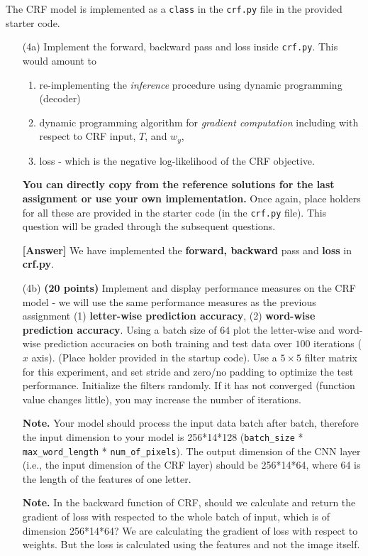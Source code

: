 \documentclass[11pt]{report}
\begin{document}
The CRF model is implemented as a \texttt{class} in the \texttt{crf.py} file in
the provided starter code.
%
\begin{itemize}
\item[(4a)] Implement the forward, backward pass and loss inside
  \texttt{crf.py}. This would amount to 
  \begin{enumerate}
  	\item re-implementing the \emph{inference} procedure using dynamic programming (decoder) 
  	\item dynamic programming algorithm for \emph{gradient computation} including with respect to CRF input, $T$, and $w_y$,
  	\item loss - which is the negative log-likelihood of the CRF objective. 
  \end{enumerate} 
	\textbf{You can directly copy from the reference solutions for the last assignment or use your own implementation.}
  Once again, place holders for
  all these are provided in the starter code (in the \texttt{crf.py} file). This
  question will be graded through the subsequent questions.

\item[\textbf{ [Answer] } ]{
We have implemented the \textbf{forward, backward} pass and \textbf{loss} in \textbf{crf.py}.
}


\item[(4b)] \textbf{(20 points)} Implement and display performance measures on
  the CRF model - we will use the same performance measures as the previous
  assignment (1) \textbf{letter-wise prediction accuracy}, (2) \textbf{word-wise
    prediction accuracy}. Using a batch size of \(64\) plot the letter-wise and
  word-wise prediction accuracies on both training and test data over \(100\)
  iterations (\(x\) axis). (Place holder provided in the startup code). Use a
  \(5 \times 5\) filter matrix for this experiment, and set stride and zero/no
  padding to optimize the test performance.
  Initialize the filters randomly.
  If it has not converged (function value changes little), you may increase the number of iterations.

{\bf Note.} Your model should process the input data batch after batch, therefore the input dimension to your model is 256*14*128 (\verb#batch_size# * \verb#max_word_length# * \verb#num_of_pixels#). The output dimension of the CNN layer (i.e., the input dimension of the CRF layer) should be 256*14*64, where 64 is the length of the features of one letter.

{\bf Note.} In the backward function of CRF, should we calculate and return the gradient of loss with respected to the whole batch of input, which is of dimension 256*14*64? We are calculating the gradient of loss with respect to weights.  But the loss is calculated using the features and not the image itself.


\end{itemize}
\end{document}

